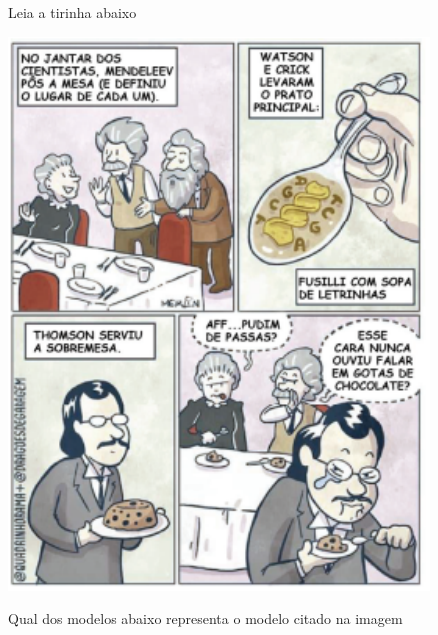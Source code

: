 \documentclass[12pt]{scrartcl}
\begin{document}
\begin{exercise}
Leia a tirinha abaixo

\begin{center}
\includegraphics[scale=1.5]{Adaptadas/cientistas.pdf}
\end{center}

Qual dos modelos abaixo representa o modelo citado na imagem


\end{exercise}
\end{document}
